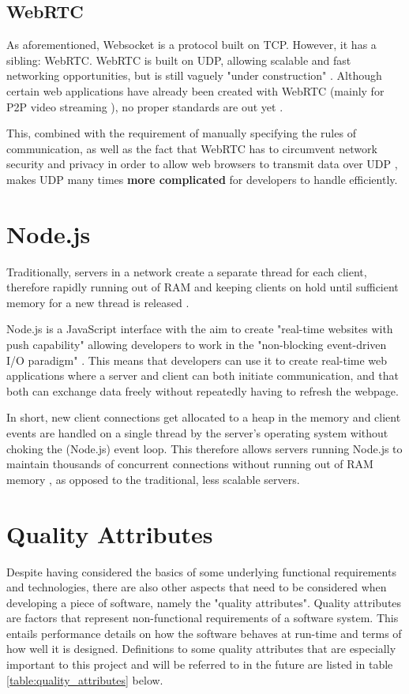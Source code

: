 \documentclass[bsc, 12pt, twoside, singlespacing, parskip, abbrevs, notimes, normalheadings, logo, deptreport]{styles/infthesis}
\begin{document}
\subsection{WebRTC}
As aforementioned, Websocket is a protocol built on TCP. However, it has a sibling: WebRTC. WebRTC is built on UDP, allowing scalable and fast networking opportunities, but is still vaguely "under construction" \cite{Browser_Networking}. Although certain web applications have already been created with WebRTC (mainly for P2P video streaming \cite{P2P_Video_Streaming_HTML5_WebRTC, Where_WebRTC}), no proper standards are out yet \cite{Web_Apps_Superior}.

This, combined with the requirement of manually specifying the rules of communication, as well as the fact that WebRTC has to circumvent network security and privacy in order to allow web browsers to transmit data over UDP \cite{P2P_Video_Streaming_HTML5_WebRTC}, makes UDP many times \textbf{more complicated} for developers to handle efficiently.

\section{Node.js}
Traditionally, servers in a network create a separate thread for each client, therefore rapidly running out of RAM and keeping clients on hold until sufficient memory for a new thread is released \cite{Why_Nodejs}.

Node.js is a JavaScript interface with the aim to create "real-time websites with push capability" allowing developers to work in the "non-blocking event-driven I/O paradigm" \cite{Why_Nodejs}. This means that developers can use it to create real-time web applications where a server and client can both initiate communication, and that both can exchange data freely without repeatedly having to refresh the webpage.

In short, new client connections get allocated to a heap in the memory and client events are handled on a single thread by the server's operating system without choking the (Node.js) event loop. This therefore allows servers running Node.js to maintain thousands of concurrent connections without running out of RAM memory \cite{Node_Stress_Test, NodeJS_Image}, as opposed to the traditional, less scalable servers.


\section{Quality Attributes}
Despite having considered the basics of some underlying functional requirements and technologies, there are also other aspects that need to be considered when developing a piece of software, namely the "quality attributes". Quality attributes are factors that represent non-functional requirements of a software system. This entails performance details on how the software behaves at run-time and terms of how well it is designed. Definitions to some quality attributes that are especially important to this project and will be referred to in the future are listed in table \ref{table:quality_attributes} below.
 
\end{document}
